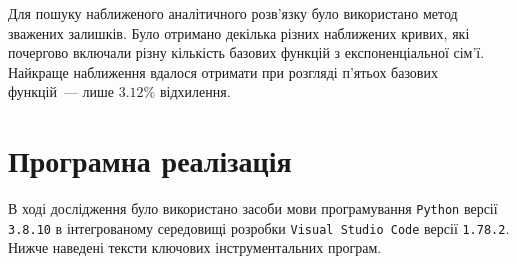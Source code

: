 \documentclass{mathreport}
\begin{document}
Для пошуку наближеного аналітичного розв'язку було використано метод зважених залишків. Було отримано декілька різних наближених кривих, які почергово включали різну кількість базових функцій з експоненціальної сім'ї. Найкраще наближення вдалося отримати при розгляді п'ятьох базових функцій~--- лише $3.12\%$ відхилення.

\newpage
\section{Програмна реалізація}

В ході дослідження було використано засоби мови програмування \texttt{Python} версії \texttt{3.8.10} в інтегрованому середовищі розробки \texttt{Visual Studio Code} версії \texttt{1.78.2}. Нижче наведені тексти ключових інструментальних програм.













\end{document}
